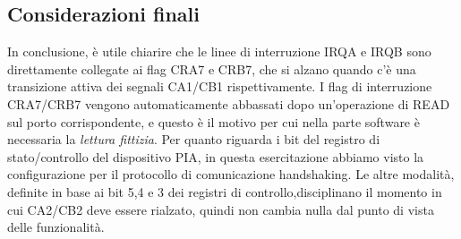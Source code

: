 \subsection{Considerazioni finali}
In conclusione, è utile chiarire che le linee di interruzione IRQA e IRQB sono direttamente collegate ai flag CRA7 e CRB7, che si alzano quando c'è una transizione attiva dei segnali CA1/CB1 rispettivamente.
I flag di interruzione CRA7/CRB7 vengono automaticamente abbassati dopo un'operazione di READ
sul porto corrispondente, e questo è il motivo per cui nella parte software è necessaria la \textit{lettura fittizia}. 
Per quanto riguarda i bit del registro di stato/controllo del dispositivo PIA, in questa esercitazione abbiamo visto la configurazione per il protocollo di comunicazione handshaking. Le altre modalità, definite in base ai bit 5,4 e 3 dei registri di controllo,disciplinano il momento in cui CA2/CB2 deve essere rialzato, quindi non cambia nulla
dal punto di vista delle funzionalità.